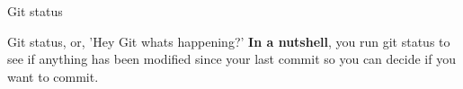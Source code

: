 \begin{frame}{Git status}
    \begin{block}{Git status, or, 'Hey Git whats happening?'}
    \textbf{In a nutshell}, you run git status to see if anything has been modified since your last commit so you can decide if you want to commit.
    
    \end{block}
\end{frame}
